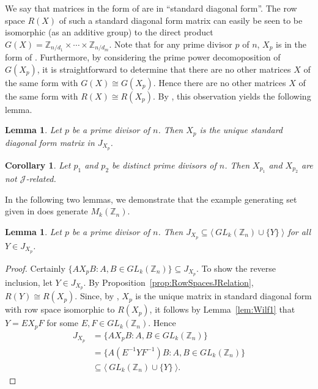 \documentclass[11pt]{article}
\newtheorem{cor}[thm]{Corollary}
\newtheorem{lemma}[thm]{Lemma}
\numberwithin{equation}{section}
\newcommand{\set}[2]{\ensuremath{\{#1 : #2 \}}}
\newcommand{\genset}[1]{\ensuremath{\langle\: #1 \:\rangle}}
\newcommand{\J}{\mathscr{J}}
\newcommand{\Z}{\mathbb{Z}}
\begin{document}
We say that matrices in the form of  are in ``standard
diagonal form''.  The row space $R(X)$ of such a standard diagonal form matrix
can easily be seen to be isomorphic (as an additive group) to the direct product
$G(X) = \Z_{n/d_1} \times \cdots \times \Z_{n/d_m}$. Note that for any prime
divisor $p$ of $n$, $X_p$ is in the form of . Furthermore, by
considering the prime power decomoposition of $G(X_p)$, it is straightforward to
determine that there are no other matrices $X$ of the same form with $G(X) \cong
G(X_p)$. Hence there are no other matrices $X$ of the same form with $R(X)
\cong R(X_p)$. By , this observation yields the
following lemma. 

\begin{lemma}
  Let $p$ be a prime divisor of $n$. Then $X_p$ is the unique standard diagonal
  form matrix in $J_{X_p}$.
\end{lemma}

\begin{cor}
  Let $p_1$ and $p_2$ be distinct prime divisors of $n$. Then $X_{p_1}$
  and $X_{p_2}$ are not $\J$-related.
\end{cor}

In the following two lemmas, we demonstrate that the example generating set
given in  does generate $M_k(\Z_n)$.

\begin{lemma}
  Let $p$ be a prime divisor of $n$.
  Then $J_{X_p} \subseteq \genset{GL_k(\Z_n) \cup \{Y\}}$ for all $Y \in
  J_{X_p}$.
\end{lemma}

\begin{proof}
    Certainly $\set{AX_{p}B}{A,B \in GL_k(\Z_n)} \subseteq J_{X_p}$.
    To show the reverse inclusion, let $Y \in J_{X_p}$.
    By Proposition~\ref{prop:RowSpacesJRelation}, $R(Y) \cong R(X_p)$.
    Since, by , $X_p$ is the unique matrix in standard
    diagonal form with row space isomorphic to $R(X_p)$,
    it follows by Lemma~\ref{lem:Wilf1} that $Y = EX_{p}F$ for some $E,F \in
    GL_k(\Z_n)$. Hence 
    \begin{align*}
      J_{X_p} &= \set{AX_{p}B}{A,B \in GL_k(\Z_n)} \\
              &= \set{A(E^{-1}YF^{-1})B}{A,B \in GL_k(\Z_n)} \\
              &\subseteq \genset{GL_k(\Z_n) \cup \{Y\}}.
    \end{align*}
\end{proof}
\end{document}
